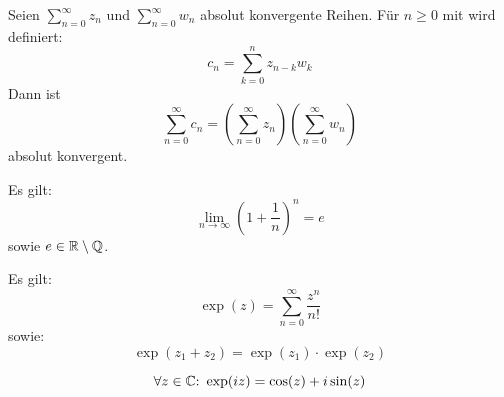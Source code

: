 \begin{framedthm}
	Seien $\sum_{n=0}^{\infty} z_n$ und $\sum_{n=0}^{\infty} w_n$ absolut konvergente Reihen. Für $n\geq 0$ mit wird definiert: \[c_n = \sum_{k=0}^{n} z_{n-k} w_k\]
	Dann ist \[\sum_{n=0}^{\infty} c_n = \left(\sum_{n=0}^{\infty} z_n\right)\left(\sum_{n=0}^{\infty} w_n\right)\] absolut konvergent.
\end{framedthm}

\begin{framedthm}
	Es gilt:
	\[\lim_{n \to \infty} \left(1+ \frac{1}{n}\right)^n = e\]
	sowie $e \in \mathbb{R} \setminus \mathbb{Q}$.
\end{framedthm}

\begin{framedthm}
	Es gilt:
	\[\exp(z) = \sum_{n=0}^{\infty} \frac{z^n}{n!}\]
	sowie:
	\[\exp(z_1+z_2) = \exp(z_1)\cdot\exp(z_2)\]
\end{framedthm}

\begin{framedthm}
	\[\forall z \in \mathbb{C}{:}\  \exp(iz) = \cos(z) + i \sin(z)\]
\end{framedthm}
